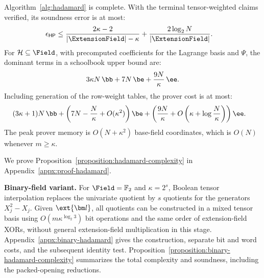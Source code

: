 \begin{proposition}
\label{proposition:hadamard-complexity}
Algorithm~\ref{alg:hadamard} is complete. With the terminal tensor-weighted
claims verified, its soundness error is at most:
\[
\begin{aligned}
    \epsilon_{\mathsf{HP}}
    &\leq
    \frac{2\kappa-2}
         {|\ExtensionField|-\kappa}
    +
    \frac{2\log_2N}
         {|\ExtensionField|}.
\end{aligned}
\]
For \(\mathcal H\subseteq\Field\), with precomputed coefficients
for the Lagrange basis and \(\Psi\), the dominant terms in a
schoolbook upper bound are:
\[
    3\kappa N\,\bb
    +
    7N\,\be
    +
    \frac{9N}{\kappa}\,\ee.
\]
Including generation of the row-weight tables, the prover cost is at most:
\[
\begin{aligned}
    &(3\kappa+1)N\,\bb+
    \left(
        7N-\frac{N}{\kappa}
        +O(\kappa^2)
    \right)\be+
    \left(
        \frac{9N}{\kappa}
        +
        O\left(
            \kappa+\log\frac{N}{\kappa}
        \right)
    \right)\ee.
\end{aligned}
\]
The peak prover memory is \(O(N+\kappa^2)\) base-field
coordinates, which is \(O(N)\) whenever \(m\geq\kappa\).
\end{proposition}

We prove Proposition~\ref{proposition:hadamard-complexity} in
Appendix~\ref{appx:proof-hadamard}.

\smallskip\noindent\textbf{Binary-field variant.}
For \(\Field=\mathbb F_2\) and \(\kappa=2^s\), Boolean
tensor interpolation replaces the univariate quotient by \(s\)
quotients for the generators \(X_j^2-X_j\).
Given \(\ext{\bm l}\), all quotients can be constructed in a
mixed tensor basis using \(O(m\kappa^{\log_2 3})\) bit operations
and the same order of extension-field XORs, without general
extension-field multiplication in this stage.
Appendix~\ref{appx:binary-hadamard} gives the construction,
separate bit and word costs, and the subsequent identity test.
Proposition~\ref{proposition:binary-hadamard-complexity}
summarizes the total complexity and soundness, including the
packed-opening reductions.

